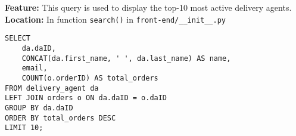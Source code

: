 \textbf{Feature:} This query is used to display the top-10 most active delivery agents. \\
\textbf{Location:} In function \texttt{search()} in \texttt{front-end/\_\_init\_\_.py}

\begin{lstlisting}
SELECT
    da.daID,
    CONCAT(da.first_name, ' ', da.last_name) AS name,
    email,
    COUNT(o.orderID) AS total_orders
FROM delivery_agent da
LEFT JOIN orders o ON da.daID = o.daID
GROUP BY da.daID
ORDER BY total_orders DESC
LIMIT 10;
\end{lstlisting}